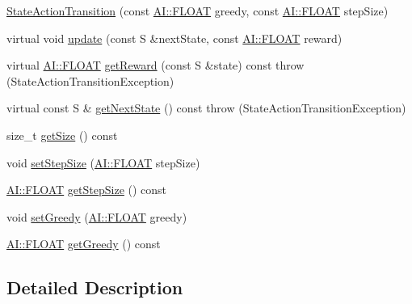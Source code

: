 \begin{DoxyCompactItemize}
\item 
\hyperlink{classAI_1_1Algorithm_1_1StateActionTransition_a0ff25726bd2c09a8d712de3fa66e541e}{State\-Action\-Transition} (const \hyperlink{namespaceAI_a41b74884a20833db653dded3918e05c3}{A\-I\-::\-F\-L\-O\-A\-T} greedy, const \hyperlink{namespaceAI_a41b74884a20833db653dded3918e05c3}{A\-I\-::\-F\-L\-O\-A\-T} step\-Size)
\item 
virtual void \hyperlink{classAI_1_1Algorithm_1_1StateActionTransition_a2e9b2a001f4199950f58429206a201e9}{update} (const S \&next\-State, const \hyperlink{namespaceAI_a41b74884a20833db653dded3918e05c3}{A\-I\-::\-F\-L\-O\-A\-T} reward)
\item 
virtual \hyperlink{namespaceAI_a41b74884a20833db653dded3918e05c3}{A\-I\-::\-F\-L\-O\-A\-T} \hyperlink{classAI_1_1Algorithm_1_1StateActionTransition_a73143dd7a80b3fb58ed0be0bb2962cd5}{get\-Reward} (const S \&state) const   throw (\-State\-Action\-Transition\-Exception)
\item 
virtual const S \& \hyperlink{classAI_1_1Algorithm_1_1StateActionTransition_a6f01c803796976ee877ac254a5698146}{get\-Next\-State} () const   throw (\-State\-Action\-Transition\-Exception)
\item 
size\-\_\-t \hyperlink{classAI_1_1Algorithm_1_1StateActionTransition_ae55f6b156e658e97688974ecad7cbcd1}{get\-Size} () const 
\item 
void \hyperlink{classAI_1_1Algorithm_1_1StateActionTransition_a50a3623dd0251375be981b3ac661df7d}{set\-Step\-Size} (\hyperlink{namespaceAI_a41b74884a20833db653dded3918e05c3}{A\-I\-::\-F\-L\-O\-A\-T} step\-Size)
\item 
\hyperlink{namespaceAI_a41b74884a20833db653dded3918e05c3}{A\-I\-::\-F\-L\-O\-A\-T} \hyperlink{classAI_1_1Algorithm_1_1StateActionTransition_ab0b343006fd9e43d986f4fcef9dee088}{get\-Step\-Size} () const 
\item 
void \hyperlink{classAI_1_1Algorithm_1_1StateActionTransition_af3fa54d2864692a5a55d4b9c1052349b}{set\-Greedy} (\hyperlink{namespaceAI_a41b74884a20833db653dded3918e05c3}{A\-I\-::\-F\-L\-O\-A\-T} greedy)
\item 
\hyperlink{namespaceAI_a41b74884a20833db653dded3918e05c3}{A\-I\-::\-F\-L\-O\-A\-T} \hyperlink{classAI_1_1Algorithm_1_1StateActionTransition_ad0afc4d202431930ab10c0514fd606dd}{get\-Greedy} () const 
\end{DoxyCompactItemize}


\subsection{Detailed Description}
